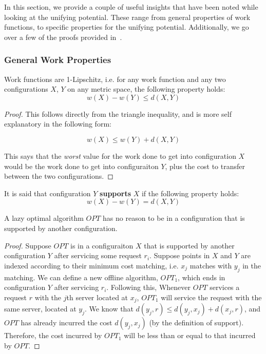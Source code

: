 In this section, we provide a couple of useful insights that have been noted while looking at the unifying potential. These range from general properties of work functions, to specific properties for the unifying potential. Additionally, we go over a few of the proofs provided in~\cite{unifyingPotential2021}. 

\subsubsection*{General Work Properties}

\begin{lemma}
    \label{lem:lip}
    Work functions are 1-Lipschitz, i.e. for any work function and any two configurations $X$, $Y$ on any metric space, the following property holds: 
    \begin{equation*}
        w(X) - w(Y) \leq d(X, Y)
    \end{equation*} 
\end{lemma}

\begin{proof}
    This follows directly from the triangle inequality, and is more self explanatory in the following form: 
    
    \begin{equation*}
        w(X) \leq w(Y) + d(X, Y)
    \end{equation*}

    This says that the \textit{worst} value for the work done to get into configuration $X$ would be the work done to get into configuraiton $Y$, plus the cost to transfer between the two configurations.
\end{proof}

\begin{definition}
    It is said that configuration $Y$ \textbf{supports} $X$ if the following property holds:
    \begin{equation*}
        w(X) - w(Y) = d(X,Y)
    \end{equation*}
\end{definition}

\begin{lemma}
    A lazy optimal algorithm $OPT$ has no reason to be in a configuration that is supported by another configuration.
\end{lemma}

\begin{proof}
    Suppose $OPT$ is in a configuraiton $X$ that is supported by another configuration $Y$ after servicing some request $r_i$. Suppose points in $X$ and $Y$ are indexed according to their minimum cost matching, i.e. $x_j$ matches with $y_j$ in the matching. We can define a new offline algorithm, $OPT_1$, which ends in configuration $Y$ after servicing $r_i$. Following this, Whenever $OPT$ services a request $r$ with the $j$th server located at $x_j$, $OPT_1$ will service the request with the same server, located at $y_j$. We know that $d(y_j, r) \leq d(y_j, x_j) + d(x_j, r)$, and $OPT$ has already incurred the cost $d(y_j, x_j)$ (by the definition of support). Therefore, the cost incurred by $OPT_1$ will be less than or equal to that incurred by $OPT$.
\end{proof}

